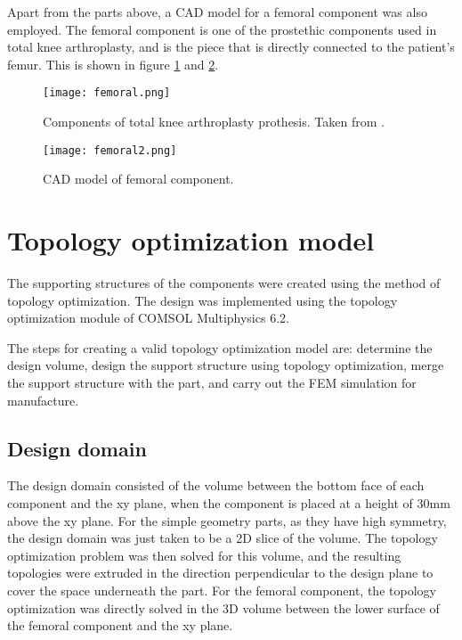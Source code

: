 \documentclass[../main.tex]{subfiles}
\begin{document}
Apart from the parts above, a CAD model for a femoral component was also employed. The femoral component is one of the prostethic components used in total knee arthroplasty, and is the piece that is directly connected to the patient's femur. This is shown in figure \ref{fig:fem1} and \ref{fig:fem2}.

\begin{figure}
  \begin{center}
  \texttt{[image: femoral.png]}
\end{center}
  \caption{Components of total knee arthroplasty prothesis. Taken from \cite{leopoldMinimallyInvasiveTotal2009}.}
  \label{fig:fem1}
\end{figure}

\begin{figure}
  \begin{center}
  \texttt{[image: femoral2.png]}
\end{center}
  \caption{CAD model of femoral component.}
  \label{fig:fem2}
\end{figure}

\section{Topology optimization model}

The supporting structures of the components were created using the method of topology optimization. The design was implemented using the topology optimization module of COMSOL Multiphysics 6.2.  

The steps for creating a valid topology optimization model are: determine the design volume, design the support structure using topology optimization, merge the support structure with the part, and carry out the FEM simulation for manufacture.

\subsection{Design domain}

The design domain consisted of the volume between the bottom face of each component and the xy plane, when the component is placed at a height of 30mm above the xy plane. For the simple geometry parts, as they have high symmetry, the design domain was just taken to be a 2D slice of the volume. The topology optimization problem was then solved for this volume, and the resulting topologies were extruded in the direction perpendicular to the design plane to cover the space underneath the part. For the femoral component, the topology optimization was directly solved in the 3D volume between the lower surface of the femoral component and the xy plane.  
\end{document}
